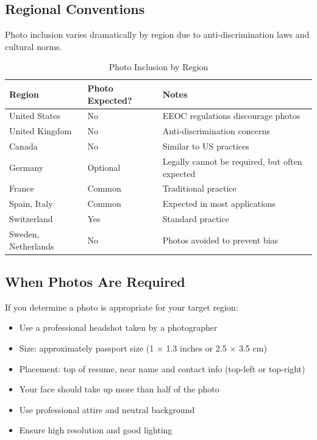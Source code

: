 \documentclass[11pt,a4paper]{article}
\begin{document}
\subsection{Regional Conventions}

Photo inclusion varies dramatically by region due to anti-discrimination laws and cultural norms.

\begin{table}[h]
\centering
\begin{tabular}{@{}lll@{}}
\toprule
\textbf{Region} & \textbf{Photo Expected?} & \textbf{Notes} \\
\midrule
United States & No & EEOC regulations discourage photos \\
United Kingdom & No & Anti-discrimination concerns \\
Canada & No & Similar to US practices \\
Germany & Optional & Legally cannot be required, but often expected \\
France & Common & Traditional practice \\
Spain, Italy & Common & Expected in most applications \\
Switzerland & Yes & Standard practice \\
Sweden, Netherlands & No & Photos avoided to prevent bias \\
\bottomrule
\end{tabular}
\caption{Photo Inclusion by Region}
\end{table}

\subsection{When Photos Are Required}

If you determine a photo is appropriate for your target region:

\begin{bestpractice}
\begin{itemize}[noitemsep]
    \item Use a professional headshot taken by a photographer
    \item Size: approximately passport size (1 $\times$ 1.3 inches or 2.5 $\times$ 3.5 cm)
    \item Placement: top of resume, near name and contact info (top-left or top-right)
    \item Your face should take up more than half of the photo
    \item Use professional attire and neutral background
    \item Ensure high resolution and good lighting
\end{itemize}
\end{bestpractice}
\end{document}
